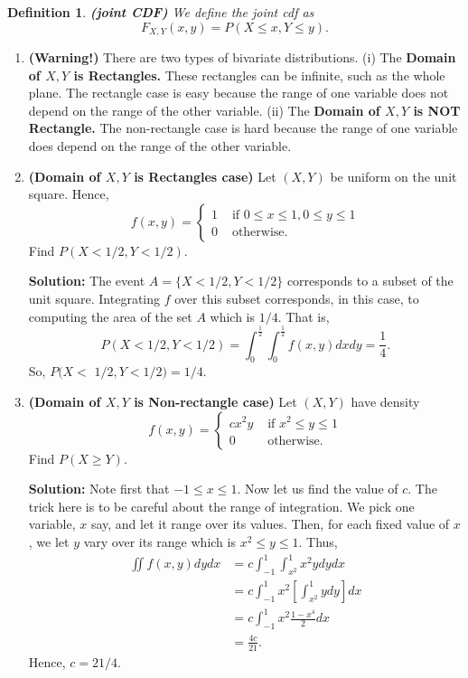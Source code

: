 \documentclass[13pt]{article}
\newtheorem{definition}[theorem]{Definition}
\theoremstyle{definition}
\newenvironment{solution}
{\color{C2}\begin{framed}\begingroup\textbf{Solution:} }
  {\endgroup\end{framed}}
\theoremstyle{remark}
\newenvironment{remark}
  {\pushQED{\qed}\renewcommand{\qedsymbol}{$\triangle$}\remarkx}
  {\popQED\endremarkx}
\begin{document}
\begin{definition}\textbf{(joint CDF)}
    We define the joint cdf as 
    \[F_{X, Y}(x, y)=P(X \leq x, Y \leq y).
    \]
\end{definition}
\begin{remark}\hfill 
    \begin{enumerate}
        \item \textbf{(Warning!)} There are two types of bivariate distributions. (i) The \textbf{Domain of $X, Y$ is Rectangles.} These rectangles can be infinite, such as the whole plane. The rectangle case is easy because the range of one variable does not depend on the range of the other variable. (ii) The \textbf{Domain of $X, Y$ is NOT Rectangle.} The non-rectangle case is hard because the range of one variable does depend on the range of the other variable. 
        \item \textbf{(Domain of $X, Y$ is Rectangles case)} Let $(X, Y)$ be uniform on the unit square. Hence,
$$
f(x, y)= \begin{cases}1 & \text { if } 0 \leq x \leq 1,0 \leq y \leq 1 \\ 0 & \text { otherwise. }\end{cases}
$$
Find $P(X<1 / 2, Y<1 / 2)$. 
\begin{solution}
The event $A=\{X<1 / 2, Y<1 / 2\}$ corresponds to a subset of the unit square. Integrating $f$ over this subset corresponds, in this case, to computing the area of the set $A$ which is $1 / 4$. That is,
\[
P(X<1 / 2, Y<1 / 2) = \int_0^{\frac{1}{2}}\int_0^{\frac{1}{2}}f(x, y) dxdy = \frac{1}{4}.
\]
So, $P(X<$ $1 / 2, Y<1 / 2)=1 / 4$.
\end{solution}
\item \textbf{(Domain of $X, Y$ is Non-rectangle case)} Let $(X, Y)$ have density
$$
f(x, y)= \begin{cases}c x^{2} y & \text { if } x^{2} \leq y \leq 1 \\ 0 & \text { otherwise. }\end{cases}
$$
Find $P(X \geq Y)$.
\begin{solution}
Note first that $-1 \leq x \leq 1$. Now let us find the value of $c$. The trick here is to be careful about the range of integration. We pick one variable, $x$ say, and let it range over its values. Then, for each fixed value of $x$, we let $y$ vary over its range which is $x^{2} \leq y \leq 1$. Thus,
$$
\begin{aligned}
\iint f(x, y) d y d x & =c \int_{-1}^{1} \int_{x^{2}}^{1} x^{2} y d y d x \\
& =c \int_{-1}^{1} x^{2}\left[\int_{x^{2}}^{1} y d y\right] d x \\
& =c \int_{-1}^{1} x^{2} \frac{1-x^{4}}{2} d x \\
& =\frac{4 c}{21} .
\end{aligned}
$$
Hence, $c=21 / 4$. 


\end{solution}
\end{enumerate}
\end{remark}
\end{document}
